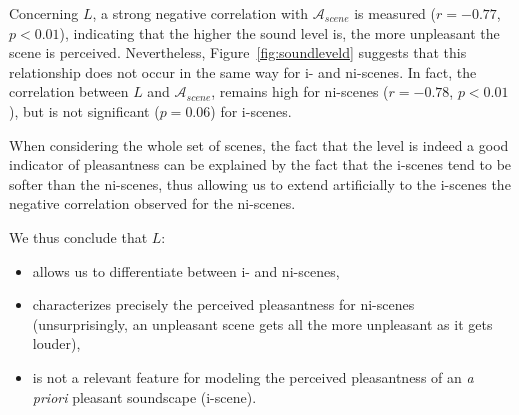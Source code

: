 \documentclass[12pt]{elsarticle}
\begin{document}

Concerning $L$, a strong negative correlation with $\mathcal{A}_{scene}$ is measured ($r=-0.77$, $p<0.01$), indicating that the higher the sound level is, the more unpleasant the scene is perceived. Nevertheless, Figure~\ref{fig:soundleveld} suggests that this relationship does not occur in the same way for i- and ni-scenes. In fact, the correlation between $L$ and $\mathcal{A}_{scene}$, remains high for ni-scenes ($r=-0.78$, $p<0.01$), but is not significant ($p=0.06$) for i-scenes.


When considering the whole set of scenes, the fact that the level is indeed a good indicator of pleasantness can be explained by the fact that the i-scenes tend to be softer than the ni-scenes, thus allowing us to extend artificially to the i-scenes the negative correlation observed for the ni-scenes.

%

We thus conclude that $L$:

\begin{itemize}
\item allows us to differentiate between i- and ni-scenes,
\item characterizes precisely the perceived pleasantness for ni-scenes (unsurprisingly, an unpleasant scene gets all the more unpleasant as it gets louder),
\item is not a relevant feature for modeling the perceived pleasantness of an \textit{a priori} pleasant soundscape (i-scene).
\end{itemize}
\end{document}
